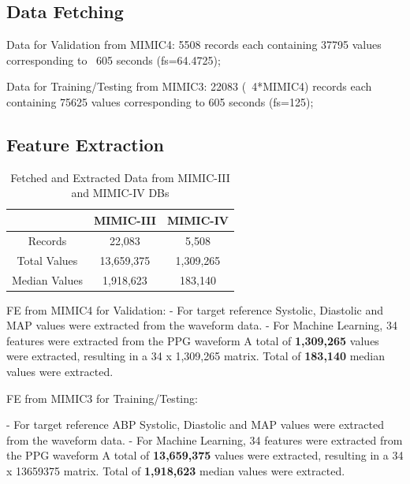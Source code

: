 \subsection{Data Fetching}
\label{subsec:data_fetching}

Data for Validation from MIMIC4:
5508 records each containing 37795 values corresponding to ~605 seconds (fs=64.4725);

Data for Training/Testing from MIMIC3:
22083 (~4*MIMIC4) records each containing 75625 values corresponding to 605 seconds (fs=125);

\subsection{Feature Extraction}
\label{subsec:feature_extraction}

\begin{table}
    \renewcommand{\arraystretch}{1.5}
    \setlength{\tabcolsep}{12pt}
    \begin{center}
        \begin{tabular}{ |c|c|c| }
            \hline
            & MIMIC-III  & MIMIC-IV  \\
            \hline
            Records       & 22,083     & 5,508     \\
            \hline
            Total Values  & 13,659,375 & 1,309,265 \\
            \hline
            Median Values & 1,918,623  & 183,140   \\
            \hline
        \end{tabular}
    \end{center}
    \captionsetup{format=plain, justification=centering}
    \caption{Fetched and Extracted Data from MIMIC-III and MIMIC-IV DBs}
    \label{tab:records}
\end{table}

FE from MIMIC4 for Validation:
- For target reference Systolic, Diastolic and MAP values were extracted from the waveform data.
- For Machine Learning, 34 features were extracted from the PPG waveform
A total of \textbf{1,309,265} values were extracted, resulting in a 34 x 1,309,265 matrix.
Total of \textbf{183,140} median values were extracted.

FE from MIMIC3 for Training/Testing:

- For target reference ABP Systolic, Diastolic and MAP values were extracted from the waveform data.
- For Machine Learning, 34 features were extracted from the PPG waveform
A total of \textbf{13,659,375} values were extracted, resulting in a 34 x 13659375 matrix.
Total of \textbf{1,918,623} median values were extracted.

